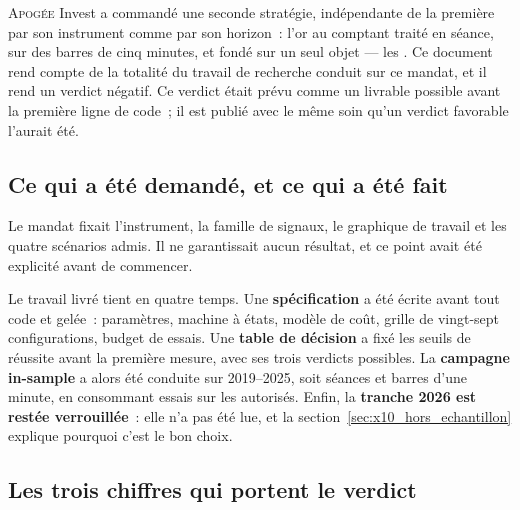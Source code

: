 \lettrine[lines=2, findent=2pt, nindent=0pt]{A}{pogée} Invest a commandé une
seconde stratégie, indépendante de la première par son instrument comme par
son horizon~: l'or au comptant traité en séance, sur des barres de cinq
minutes, et fondé sur un seul objet --- les . Ce document rend compte de la totalité du travail de recherche
conduit sur ce mandat, et il rend un verdict négatif. Ce verdict était prévu
comme un livrable possible avant la première ligne de code~; il est publié
avec le même soin qu'un verdict favorable l'aurait été.

\subsection*{Ce qui a été demandé, et ce qui a été fait}

Le mandat fixait l'instrument, la famille de signaux, le graphique de travail
et les quatre scénarios admis. Il ne garantissait aucun résultat, et ce point
avait été explicité avant de commencer.

Le travail livré tient en quatre temps. Une \textbf{spécification} a été écrite
avant tout code et gelée~: paramètres, machine à états, modèle de coût, grille
de vingt-sept configurations, budget de \XTenTrialsCeiling{} essais. Une
\textbf{table de décision} a fixé les seuils de réussite avant la première
mesure, avec ses trois verdicts possibles. La \textbf{campagne in-sample} a
alors été conduite sur 2019--2025, soit \XTenSampleSessions{} séances et
\XTenSampleBarsMOne{} barres d'une minute, en consommant \XTenTrialsCount{}
essais sur les \XTenTrialsCeiling{} autorisés. Enfin, la
\textbf{tranche 2026 est restée verrouillée}~: elle n'a pas été lue, et la
section~\ref{sec:x10_hors_echantillon} explique pourquoi c'est le bon choix.

\subsection*{Les trois chiffres qui portent le verdict}

